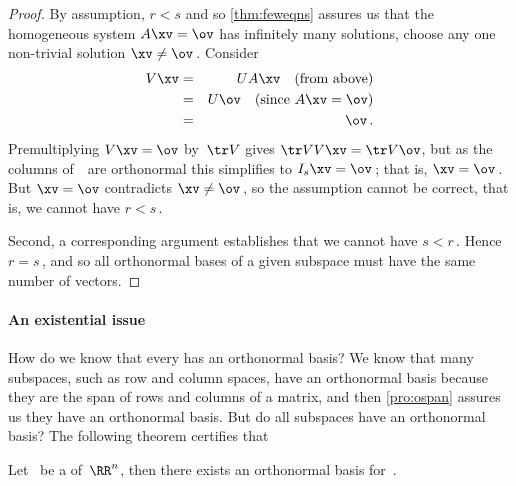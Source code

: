 \begin{proof}
By assumption, \(r<s\) and so \cref{thm:feweqns} assures us that the homogeneous system \(A\xv=\ov\) has infinitely many solutions, choose any one non-trivial solution \(\xv\neq\ov\)\,.
Consider 
\begin{eqnarray*}
V\xv&=& UA\xv\quad(\text{from above})
\\&=&U\ov\quad(\text{since }A\xv=\ov)
\\&=&\ov\,.
\end{eqnarray*}
Premultiplying \(V\xv=\ov\) by~\(\tr V\) gives \(\tr VV\xv=\tr V\ov\), but as the columns of~\cV\ are orthonormal this simplifies to \(I_s\xv=\ov\)\,; that is, \(\xv=\ov\)\,.  
But \(\xv=\ov\) contradicts \(\xv\neq\ov\)\,, so the assumption cannot be correct, that is, we cannot have \(r<s\)\,.

Second, a corresponding argument establishes that we cannot have \(s<r\)\,.
Hence \(r=s\)\,, and so all orthonormal bases of a given subspace must have the same number of vectors.
\end{proof}

\paragraph{An existential issue} 
How do we know that every  has an orthonormal basis? 
We know that many subspaces, such as row and column spaces, have an orthonormal basis because they are the span of rows and columns of a matrix, and then \cref{pro:ospan} assures us they have an orthonormal basis.
But do all subspaces have an orthonormal basis?  
The following theorem certifies that 



\begin{theorem} \label{thm:obaseexists}
Let \WW\ be a  of~\(\RR^n\), then there exists an orthonormal basis for~\WW.
\end{theorem}

